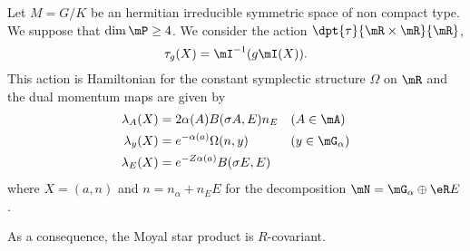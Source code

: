 \begin{proposition}
Let $M=G/K$ be an hermitian irreducible symmetric space of non compact type. We suppose that $\dim\mP\geq 4$. We consider the action $\dpt{ \tau }{  \mR\times\mR  }{ \mR }$,
\[ 
  \tau_g(X)=\mI^{-1}(g\mI(X)).
\]
This action is Hamiltonian for the constant symplectic structure $\Omega$ on $\mR$ and the dual momentum maps are given by
\begin{subequations}
\begin{align}
\lambda_A(X)&=2\alpha(A)B(\sigma A,E)n_E&&\text{($A\in \mA$)}\\
\lambda_y(X)&= e^{-\alpha(a)}\Omega(n,y)&&\text{($y\in\mG_{\alpha}$)}\\
\lambda_E(X)&= e^{-Z\alpha(a)}B(\sigma E,E)
\end{align}
\end{subequations}
where $X=(a,n)$ and $n=n_{\alpha}+n_EE$ for the decomposition $\mN=\mG_{\alpha}\oplus\eR E$.

As a consequence, the Moyal star product is $R$-covariant.

\end{proposition}

